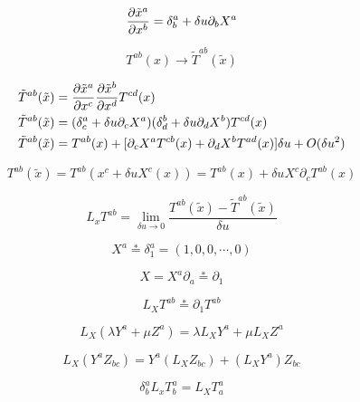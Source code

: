 \documentclass[../main]{subfiles}
\begin{document}
\begin{equation}
    \pdv{\tilde{x}^a}{x^b}=\delta_b^a+\delta u \partial_b X^a
\end{equation}

\begin{equation}
    T^{ab}(x) \rightarrow \tilde{T}^{ab}(\tilde{x})
\end{equation}

\begin{align}
    \tilde{T}^{ab}(\tilde{x})&=\pdv{\tilde{x}^a}{x^c} \pdv{\tilde{x}^b}{x^d} T^{cd}(x) \nonumber \\
    \tilde{T}^{ab}(\tilde{x})&=(\delta_c^a+\delta u \partial_c X^a)(\delta_d^b+\delta u \partial_d X^b) T^{cd}(x) \nonumber \\
    \tilde{T}^{ab}(\tilde{x})&=T^{ab}(x)+[\partial_c X^a T^{cb}(x)+\partial_d X^b T^{ad}(x)]\delta u+O(\delta u^2)
\end{align}

\begin{equation}
    T^{ab}(\tilde{x})=T^{ab}(x^c+\delta u X^c(x))=T^{ab}(x)+\delta u X^c \partial_c T^{ab}(x)
\end{equation}

\begin{equation}
    L_x T^{ab}=\lim_{\delta u \rightarrow 0} \dfrac{T^{ab}(\tilde{x})-\tilde{T}^{ab}(\tilde{x})}{\delta u}
\end{equation}

\begin{equation}
    X^a \overset{*}{=} \delta_1^a=(1,0,0,\cdots,0)
\end{equation}

\begin{equation*}
    X=X^a \partial_a \overset{*}{=} \partial_1
\end{equation*}

\begin{equation}
    L_X T^{ab} \overset{*}{=} \partial_1 T^{ab}
\end{equation}

\begin{equation}
    L_X (\lambda Y^a+\mu Z^a)=\lambda L_X Y^a + \mu L_X Z^a
\end{equation}

\begin{equation}
    L_X (Y^a Z_{bc})=Y^a (L_X Z_{bc})+(L_X Y^a) Z_{bc}
\end{equation}

\begin{equation}
    \delta_b^{a}L_x T^a_b=L_X T^a_a
\end{equation}
\end{document}
